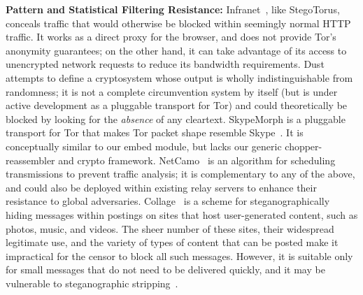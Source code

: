 \smallskip\noindent\textbf{Pattern and Statistical Filtering
  Resistance:}
Infranet~\cite{c-infranet}, like StegoTorus, conceals traffic that
would otherwise be blocked within seemingly normal HTTP traffic.  It
works as a direct proxy for the browser, and does not provide Tor's
anonymity guarantees; on the other hand, it can take advantage of its
access to unencrypted network requests to reduce its bandwidth
requirements.  Dust~\cite{c-dust} attempts to define a cryptosystem
whose output is wholly indistinguishable from randomness; it is not a
complete circumvention system by itself (but is under active
development as a pluggable transport for Tor) and could theoretically
be blocked by looking for the \emph{absence} of any cleartext.
SkypeMorph is a pluggable transport for Tor that makes Tor packet
shape resemble Skype~\cite{c-skypemorph}.  It is conceptually similar
to our embed module, but lacks our generic chopper-reassembler and
crypto framework.  NetCamo~\cite{c-netcamo} is an algorithm for
scheduling transmissions to prevent traffic analysis; it is
complementary to any of the above, and could also be deployed within
existing relay servers to enhance their resistance to global
adversaries.  Collage~\cite{c-ugc} is a scheme for steganographically
hiding messages within postings on sites that host user-generated
content, such as photos, music, and videos.  The sheer number of these
sites, their widespread legitimate use, and the variety of types of
content that can be posted make it impractical for the censor to block
all such messages.  However, it is suitable only for small messages
that do not need to be delivered quickly, and it may be vulnerable to
steganographic stripping~\cite{a-strip-steg}.


